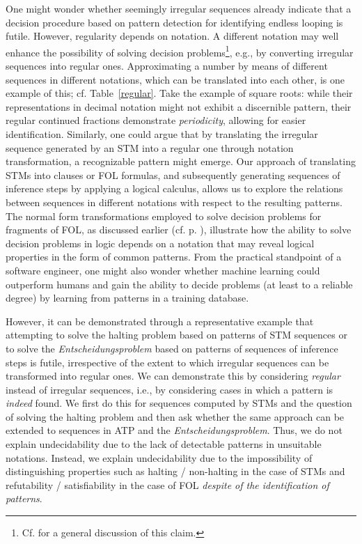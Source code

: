 \documentclass[%
  manuscript=article,   %
  year=2024,
  volume=77,
  doi=00000.000,
]{zfn}
\begin{document}
One might wonder whether seemingly irregular sequences already indicate that a decision procedure based on pattern detection for identifying endless looping is futile. However, regularity depends on notation.
A different notation may well enhance the possibility of solving decision problems\footnote{Cf. \parencite{Lampert2} for a general discussion of this claim.}, e.g., by converting irregular sequences into regular ones.
Approximating a number by means of different sequences in different notations, which can be translated into each other, is one example of this; cf. Table~\ref{regular}. Take the example of square roots: while their representations in decimal notation might not exhibit a discernible pattern, their regular continued fractions demonstrate \emph{periodicity}, allowing for easier identification.
Similarly, one could argue that by translating the irregular sequence generated by an STM into a regular one through notation transformation, a recognizable pattern might emerge. Our approach of translating STMs into clauses or FOL formulas, and subsequently generating sequences of inference steps by applying a logical calculus, allows us to explore the relations between sequences in different notations with respect to the resulting patterns.
The normal form transformations employed to solve decision problems for fragments of FOL, as discussed earlier (cf. p. \pageref{normalforms}), illustrate how the ability to solve decision problems in logic depends on a notation that may reveal logical properties in the form of common patterns. From the practical standpoint of a software engineer, one might also wonder whether machine learning could outperform humans and gain the ability to decide problems (at least to a reliable degree) by learning from patterns in a training database.

However, it can be demonstrated through a representative example that attempting to solve the halting problem based on patterns of STM sequences or to solve the \emph{Entscheidungsproblem} based on patterns of sequences of inference steps is futile, irrespective of the extent to which irregular sequences can be transformed into regular ones.
We can demonstrate this by considering \emph{regular} instead of irregular sequences, i.e., by considering cases in which a pattern is \textit{indeed} found. We first do this for sequences computed by STMs and the question of solving the halting problem and then ask whether the same approach can be extended to sequences in ATP and the \emph{Entscheidungsproblem}. Thus, we do not explain undecidability due to the lack of detectable patterns in unsuitable notations. Instead, we explain undecidability due to the impossibility of distinguishing properties such as halting / non-halting in the case of STMs and refutability / satisfiability in the case of FOL \emph{despite of the identification of patterns}. 
\end{document}
